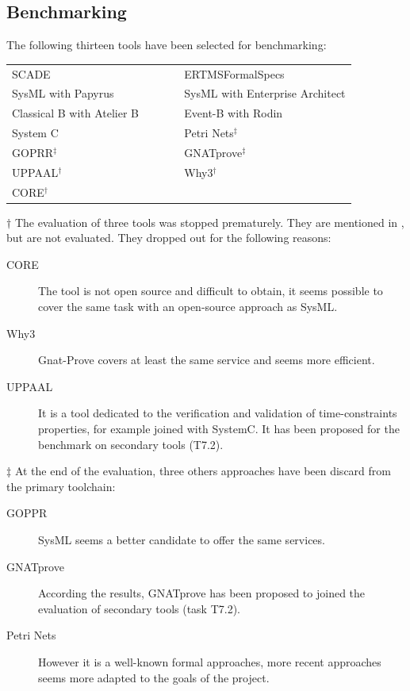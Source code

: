 \subsection{Benchmarking}
\label{sec:benchmarking}

The following thirteen tools have been selected for benchmarking:

\begin{tabular}{ p{0.5\linewidth} p{0.5\linewidth} }
SCADE & ERTMSFormalSpecs \\
SysML with Papyrus & SysML with Enterprise Architect \\
Classical B with Atelier B & Event-B with Rodin \\
System C & Petri Nets$^\ddagger$ \\
GOPRR$^\ddagger$ & GNATprove$^\ddagger$ \\
UPPAAL$^\dagger$ & Why3$^\dagger$ \\
CORE$^\dagger$
\end{tabular}

$\dagger$ The evaluation of three tools was stopped prematurely.  They are mentioned in \citep{WP7_O719}, but are not evaluated.  They dropped out for the following reasons:

\begin{description}
\item[CORE] The tool is not open source and difficult to obtain, it seems possible to cover the same task with an open-source approach as SysML.
\item[Why3] Gnat-Prove covers at least the same service and seems more efficient.
\item[UPPAAL] It is a tool dedicated to the verification and validation of time-constraints properties, for example joined with SystemC. It has been proposed for the benchmark on secondary tools (T7.2).
\end{description}

$\ddagger$ At the end of the evaluation, three others approaches have been discard from the primary toolchain:

\begin{description}
\item[GOPPR] SysML seems a better candidate to offer the same services.
\item[GNATprove] According the results, GNATprove has been proposed to joined the evaluation of secondary tools (task T7.2).
\item[Petri Nets] However it is a well-known formal approaches, more recent approaches seems more adapted to the goals of the project.
\end{description}

